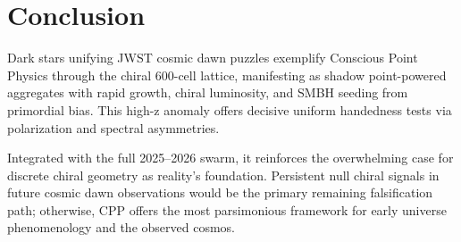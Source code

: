 \documentclass[11pt]{article}
\begin{document}
\section{Conclusion}
Dark stars unifying JWST cosmic dawn puzzles exemplify Conscious Point Physics through the chiral 600-cell lattice, manifesting as shadow point-powered aggregates with rapid growth, chiral luminosity, and SMBH seeding from primordial bias. This high-z anomaly offers decisive uniform handedness tests via polarization and spectral asymmetries.  

Integrated with the full 2025--2026 swarm, it reinforces the overwhelming case for discrete chiral geometry as reality's foundation. Persistent null chiral signals in future cosmic dawn observations would be the primary remaining falsification path; otherwise, CPP offers the most parsimonious framework for early universe phenomenology and the observed cosmos.
\end{document}
